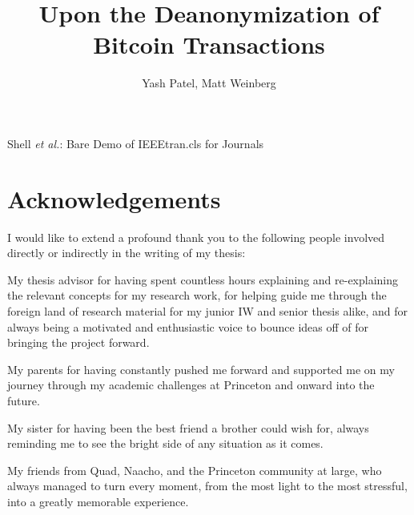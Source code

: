\documentclass{article}
\begin{document}
\title{Upon the Deanonymization of Bitcoin Transactions}
\author{Yash Patel, Matt Weinberg}

%
{Shell \MakeLowercase{\textit{et al.}}: Bare Demo of IEEEtran.cls for Journals}

\maketitle
\thispagestyle{empty}
\clearpage

\doublespacing
{}
\section*{Acknowledgements}
I would like to extend a profound thank you to the following people involved directly or indirectly in the writing of my thesis:

My thesis advisor for having spent countless hours explaining and re-explaining the relevant concepts for my research work, for helping guide me through the foreign land of research material for my junior IW and senior thesis alike, and for always being a motivated and enthusiastic voice to bounce ideas off of for bringing the project forward.

My parents for having constantly pushed me forward and supported me on my journey through my academic challenges at Princeton and onward into the future.

My sister for having been the best friend a brother could wish for, always reminding me to see the bright side of any situation as it comes. 

My friends from Quad, Naacho, and the Princeton community at large, who always managed to turn every moment, from the most light to the most stressful, into a greatly memorable experience.

\clearpage
\singlespacing
\tableofcontents
\clearpage
\listoffigures
\listoftables
\clearpage


\begin{abstract}
\end{abstract}

\clearpage
\doublespacing
\end{document}
